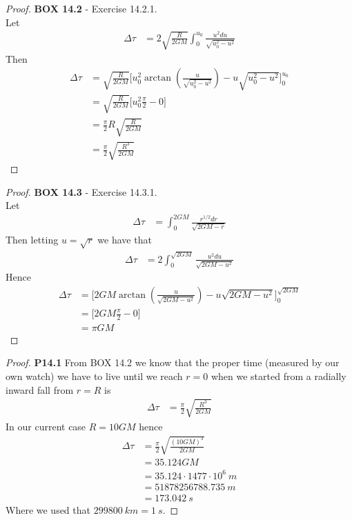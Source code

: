 \documentclass[11pt]{article}
\theoremstyle{definition}
\begin{document}
\cleardoublepage
\begin{proof}{\textbf{BOX 14.2} - Exercise 14.2.1.}\\
Let
\begin{align*}
    \Delta\tau
    &= 2\sqrt{\frac{R}{2GM}}\int_0^{u_0} \frac{u^2 du}{\sqrt{u_0^2 - u^2}}
\end{align*}
Then
\begin{align*}
    \Delta\tau
    &= \sqrt{\frac{R}{2GM}}\bigg[
        u_0^2\arctan(\frac{u}{\sqrt{u_0^2 - u^2}}) - u\sqrt{u_0^2 - u^2}
    \bigg]_0^{u_0}\\
    &= \sqrt{\frac{R}{2GM}}\bigg[u_0^2\frac{\pi}{2} - 0\bigg]\\
    &= \frac{\pi}{2}R\sqrt{\frac{R}{2GM}}\\
    &= \frac{\pi}{2}\sqrt{\frac{R^3}{2GM}}
\end{align*}
\end{proof}
\begin{proof}{\textbf{BOX 14.3} - Exercise 14.3.1.}\\
Let 
\begin{align*}
    \Delta\tau &= \int_0^{2GM} \frac{r^{1/2} dr}{\sqrt{2GM - r}}
\end{align*}
Then letting $u = \sqrt{r}$ we have that
\begin{align*}
    \Delta\tau &= 2\int_0^{\sqrt{2GM}} \frac{u^2 du}{\sqrt{2GM - u^2}}
\end{align*}
Hence
\begin{align*}
    \Delta\tau
    &= \bigg[
        2GM\arctan(\frac{u}{\sqrt{2GM - u^2}}) - u\sqrt{2GM - u^2}
    \bigg]_0^{\sqrt{2GM}}\\
    &= \bigg[2GM\frac{\pi}{2} - 0\bigg]\\
    &=\pi GM
\end{align*}
\end{proof}

\cleardoublepage
\begin{proof}{\textbf{P14.1}}
From BOX 14.2 we know that the proper time (measured by our own watch) we have
to live until we reach $r = 0$ when we started from a radially inward fall
from $r = R$ is 
\begin{align*}
    \Delta\tau &= \frac{\pi}{2}\sqrt{\frac{R^3}{2GM}}
\end{align*}
In our current case $R = 10GM$ hence
\begin{align*}
    \Delta\tau &= \frac{\pi}{2}\sqrt{\frac{(10GM)^3}{2GM}}\\
    &= 35.124 GM\\
    &= 35.124\cdot 1477 \cdot 10^6~m\\
    &= 51878256788.735~m\\
    &= 173.042~s
\end{align*}
Where we used that $299800~km = 1~s$.
\end{proof}
\end{document}
